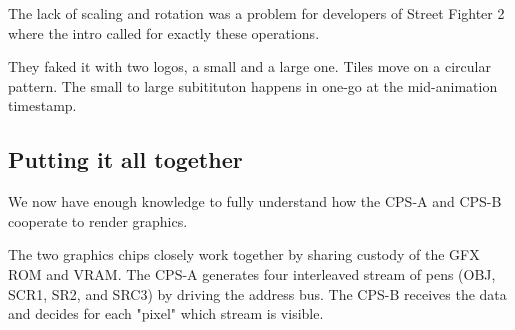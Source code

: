 \begin{minipage}[t]{0.32\linewidth}
\end{minipage}%
\hfill%
\begin{minipage}[t]{0.32\linewidth}
\end{minipage}
\hfill%
\begin{minipage}[t]{0.32\linewidth}
\end{minipage}

\begin{minipage}[t]{0.32\linewidth}
\end{minipage}%
\hfill%
\begin{minipage}[t]{0.32\linewidth}
\end{minipage}
\hfill%
\begin{minipage}[t]{0.32\linewidth}
\end{minipage}

\begin{minipage}[t]{0.32\linewidth}
\end{minipage}%
\hfill%
\begin{minipage}[t]{0.32\linewidth}
\end{minipage}
\hfill%
\begin{minipage}[t]{0.32\linewidth}
\end{minipage}

The lack of scaling and rotation was a problem for developers of Street Fighter 2 where the intro called for exactly these operations. 

They faked it with two logos, a small and a large one. Tiles move on a circular pattern. The small to large subitituton happens in one-go at the mid-animation timestamp.

\pagebreak





\subsection{Putting it all together}

We now have enough knowledge to fully understand how the CPS-A and CPS-B cooperate to render graphics.

The two graphics chips closely work together by sharing custody of the GFX ROM and VRAM. The CPS-A generates four interleaved stream of pens (OBJ, SCR1, SR2, and SRC3) by driving the address bus. The CPS-B receives the data and decides for each "pixel" which stream is visible. 

